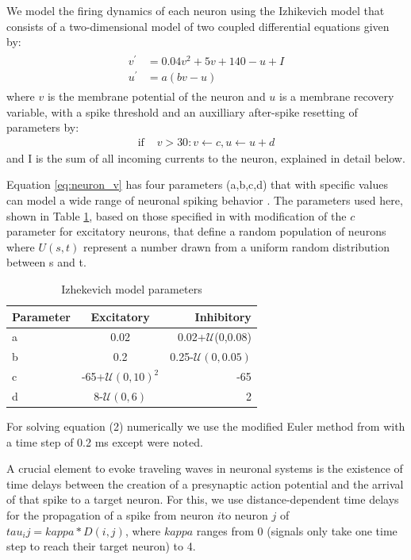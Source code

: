 \documentclass[a4paper,11pt]{article}
\begin{document}
We model the firing dynamics of each neuron using the Izhikevich model \cite{izhikevich2003} that consists of a two-dimensional model of two coupled differential equations given by:
\begin{align}
 \begin{split}
  v^\prime &= 0.04v^2+5v+140-u+I \label{eq:neuron_v} \\
  u^\prime &= a(bv-u)
 \end{split}
\end{align}
where $v$ is the membrane potential of the neuron and $u$ is a membrane recovery variable, with a spike threshold and an auxilliary after-spike resetting of parameters by:
\begin{align}
  \text{if } &v>30: v\leftarrow c, u\leftarrow u+d
\end{align}
and I is the sum of all incoming currents to the neuron, explained in detail below. 

Equation \ref{eq:neuron_v} has four parameters (a,b,c,d) that with specific values can model a wide range of neuronal spiking behavior \cite{izhikevich2003}. 
The parameters used here, shown in Table \ref{tab:izzy_params}, based on those specified in \cite{izhikevich2003} with modification of the $c$ parameter for excitatory neurons, that define a random population of neurons where $U(s,t)$ represent a number drawn from a uniform random distribution between s and t. 
\begin{table}[!htb]
 \caption{Izhekevich model parameters}
 \label{tab:izzy_params}
 \centering
 \begin{tabular}{l|c|r}
  \textbf{Parameter} & \textbf{Excitatory} & \textbf{Inhibitory} \\
  \hline
  a & 0.02 & 0.02+$\mathcal{U}$(0,0.08) \\
  b & 0.2 & 0.25-$\mathcal{U}(0,0.05)$\\
  c & -65+$\mathcal{U}(0,10)^2$ & -65 \\
  d & 8-$\mathcal{U}(0,6)$& 2 \\
 \end{tabular}
\end{table}
For solving equation (2) numerically we use the modified Euler method from \cite{izhikevich2003} with a time step of 0.2 ms except were noted. 

A crucial element to evoke traveling waves in neuronal systems is the existence of time delays between the creation of a presynaptic action potential and the arrival of that spike to a target neuron. 
For this, we use distance-dependent time delays for the propagation of a spike from neuron $i$to neuron $j$ of $tau_ij = kappa * D(i,j)$, where $kappa$ ranges from 0 (signals only take one time step to reach their target neuron) to 4. 
\end{document}
